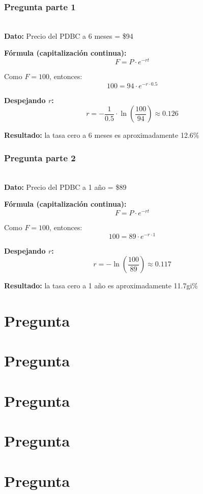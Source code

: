 \documentclass{beamer}
\newif\ifpresentacion
\newcommand{\pausa}{\ifpresentacion\pause\fi}
\begin{document}
\begin{frame}
      \frametitle{Pregunta  parte 1}
      \LARGE {} \\[1em]
  
      \footnotesize
      \textbf{Dato:} Precio del PDBC a 6 meses = \$94
  
      \pausa
  
      \textbf{Fórmula (capitalización continua):}
      \[
      F = P \cdot e^{-rt}
      \]
  
      \pausa
  
      Como $F = 100$, entonces:
      \[
      100 = 94 \cdot e^{-r \cdot 0.5}
      \]
  
      \pausa
  
      \textbf{Despejando $r$:}
      \[
      r = -\frac{1}{0.5} \cdot \ln\left(\frac{100}{94}\right) \approx 0.126
      \]
  
      \pausa
  
      \textbf{Resultado:} la tasa cero a 6 meses es aproximadamente 12.6\%
\end{frame}
\begin{frame}
      \frametitle{Pregunta  parte 2}
      \LARGE {} \\[1em]
  
      \footnotesize
      \textbf{Dato:} Precio del PDBC a 1 año = \$89
  
      \pausa
  
      \textbf{Fórmula (capitalización continua):}
      \[
      F = P \cdot e^{-rt}
      \]
  
      \pausa
  
      Como $F = 100$, entonces:
      \[
      100 = 89 \cdot e^{-r \cdot 1}
      \]
  
      \pausa
  
      \textbf{Despejando $r$:}
      \[
      r = -\ln\left(\frac{100}{89}\right) \approx 0.117
      \]
  
      \pausa
  
      \textbf{Resultado:} la tasa cero a 1 año es aproximadamente 11.7gi\%
\end{frame}
\section{Pregunta }
\section{Pregunta }
\section{Pregunta }
\section{Pregunta }
\section{Pregunta }
\end{document}
